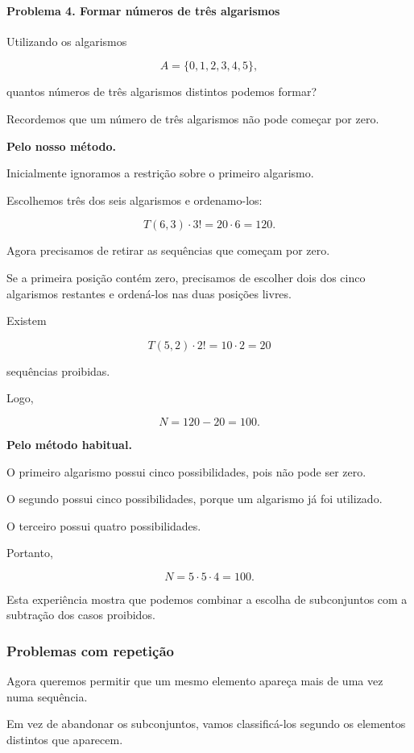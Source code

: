 \documentclass[11pt,a4paper,oneside]{book}
\begin{document}
\paragraph{Problema 4. Formar números de três algarismos}

Utilizando os algarismos

\[
A=\{0,1,2,3,4,5\},
\]

quantos números de três algarismos distintos
podemos formar?

Recordemos que um número de três algarismos
não pode começar por zero.

\textbf{Pelo nosso método.}

Inicialmente ignoramos a restrição
sobre o primeiro algarismo.

Escolhemos três dos seis algarismos
e ordenamo-los:

\[
T(6,3)\cdot3!=20\cdot6=120.
\]

Agora precisamos de retirar as sequências
que começam por zero.

Se a primeira posição contém zero,
precisamos de escolher dois dos cinco
algarismos restantes e ordená-los
nas duas posições livres.

Existem

\[
T(5,2)\cdot2!=10\cdot2=20
\]

sequências proibidas.

Logo,

\[
N=120-20=\boxed{100}.
\]

\textbf{Pelo método habitual.}

O primeiro algarismo possui cinco
possibilidades, pois não pode ser zero.

O segundo possui cinco possibilidades,
porque um algarismo já foi utilizado.

O terceiro possui quatro possibilidades.

Portanto,

\[
N=5\cdot5\cdot4=\boxed{100}.
\]

Esta experiência mostra que podemos
combinar a escolha de subconjuntos
com a subtração dos casos proibidos.

\subsubsection*{Problemas com repetição}

Agora queremos permitir que um mesmo elemento
apareça mais de uma vez numa sequência.

Em vez de abandonar os subconjuntos,
vamos classificá-los segundo os elementos
distintos que aparecem.
\end{document}
